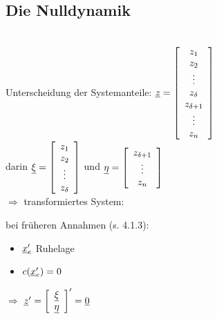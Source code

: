 \documentclass[openany,a4paper,11pt]{book}
\begin{document}
\subsection{Die Nulldynamik} \\
Unterscheidung der Systemanteile: $\uline{z}= \left[ \begin{array}{c} z_1\\ z_2\\ \vdots\\ z_{\delta}\\ z_{\delta+1}\\ \vdots\\ z_n\\ \end{array} \right]$ \\
darin $\uline{\xi}= \left[ \begin{array}{c} z_1\\ z_2\\ \vdots\\ z_{\delta}\\ \end{array} \right]$ und $\uline{\eta}= \left[ \begin{array}{c} z_{\delta+1}\\ \vdots\\ z_n\\ \end{array} \right]$\\
$\Rightarrow$ transformiertes System:  
    \begin{minipage}[c]{\textwidth}
    \end{minipage}
bei früheren Annahmen (s. 4.1.3): \begin{itemize}
    \item $\uline{x}_e'$ Ruhelage
    \item $c(\uline{x}_e')=0$
\end{itemize}   
$\Rightarrow$ $\uline{z}'=\left[ \begin{array}{c}\uline{\xi}\\ \uline{\eta}\\ \end{array}\right] '=\uline{0}$\\
\end{document}
